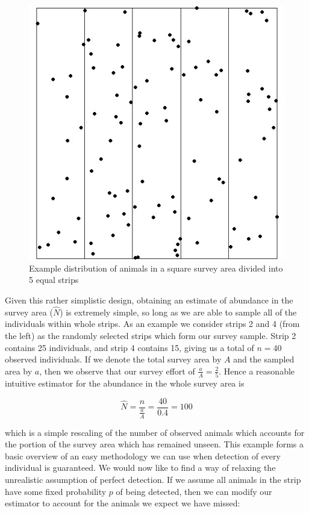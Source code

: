 \documentclass[11pt]{article}
\begin{document}
\begin{multicols}{2}
\begin{figure}[H]
\centering
\includegraphics[scale=0.5]{StripSampling}
\caption{Example distribution of animals in a square survey area divided into 5 equal strips}
\end{figure}

Given this rather simplistic design, obtaining an estimate of abundance in the survey area ($\hat{N}$) is extremely simple, so long as we are able to sample all of the individuals within whole strips. As an example we consider strips 2 and 4 (from the left) as the randomly selected strips which form our survey sample. Strip 2 contains 25 individuals, and strip 4 contains 15, giving us a total of $n=40$ observed individuals. If we denote the total survey area by $A$ and the sampled area by $a$, then we observe that our survey effort of $\frac{a}{A}=\frac{2}{5}$. Hence a reasonable intuitive estimator for the abundance in the whole survey area is

\begin{equation}
\hat{N}=\frac{n}{\frac{a}{A}}=\frac{40}{0.4}=100
\end{equation}

which is a simple rescaling of the number of observed animals which accounts for the portion of the survey area which has remained unseen. This example forms a basic overview of an easy methodology we can use when detection of every individual is guaranteed. We would now like to find a way of relaxing the unrealistic assumption of perfect detection. If we assume all animals in the strip have some fixed probability $p$ of being detected, then we can modify our estimator to account for the animals we expect we have missed:


\end{multicols}
\end{document}
